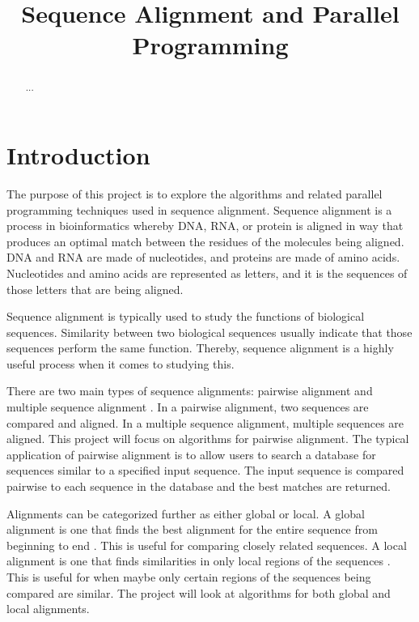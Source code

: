 \documentclass[conference]{IEEEtran}
\begin{document}
\title{Sequence Alignment and Parallel Programming}

\author{
\and
{}
\and
{}
}

\maketitle

\begin{abstract}
...
\end{abstract}

\section{Introduction}
The purpose of this project is to explore the algorithms and related parallel programming techniques used in sequence alignment. Sequence alignment is a process in bioinformatics whereby DNA, RNA, or protein is aligned in way that produces an optimal match between the residues of the molecules being aligned. DNA and RNA are made of nucleotides, and proteins are made of amino acids. Nucleotides and amino acids are represented as letters, and it is the sequences of those letters that are being aligned.

Sequence alignment is typically used to study the functions of biological sequences. Similarity between two biological sequences usually indicate that those sequences perform the same function. Thereby, sequence alignment is a highly useful process when it comes to studying this.

There are two main types of sequence alignments: pairwise alignment and multiple sequence alignment \cite{chaudhary_liu_matta_yang_2005}. In a pairwise alignment, two sequences are compared and aligned. In a multiple sequence alignment, multiple sequences are aligned. This project will focus on algorithms for pairwise alignment. The typical application of pairwise alignment is to allow users to search a database for sequences similar to a specified input sequence. The input sequence is compared pairwise to each sequence in the database and the best matches are returned.

Alignments can be categorized further as either global or local. A global alignment is one that finds the best alignment for the entire sequence from beginning to end \cite{global_alignment}. This is useful for comparing closely related sequences. A local alignment is one that finds similarities in only local regions of the sequences \cite{global_alignment}. This is useful for when maybe only certain regions of the sequences being compared are similar. The project will look at algorithms for both global and local alignments.
\end{document}

